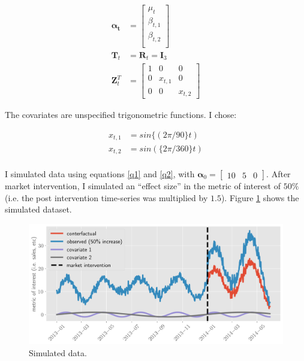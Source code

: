 \documentclass[12pt]{article}
\begin{document}
\begin{align*}
    \boldsymbol{\alpha_t} &= \begin{bmatrix}
\mu_{t} \\
\beta_{t, 1} \\
\beta_{t, 2} \\
\end{bmatrix}\\
\boldsymbol{T}_t &= \boldsymbol{R}_t = \boldsymbol{I}_3\\
\boldsymbol{Z}_t^T &=\begin{bmatrix}
1 & 0 & 0\\
0 & x_{t, 1} & 0\\
0 & 0 & x_{t, 2}
\end{bmatrix} 
\end{align*}

The covariates are unspecified trigonometric functions. I chose:

\begin{align*}
    x_{t, 1} &= sin\{(2\pi/90\}  t) \\
x_{t, 2} &= sin(\{2\pi/360\}  t)\\
\end{align*}

I simulated data using equations \ref{q1} and \ref{q2}, with $\boldsymbol{\alpha}_0 = \begin{bmatrix} 10 &5 & 0
\end{bmatrix} $. After market intervention, I simulated an ``effect size'' in the metric of interest of $50\%$ (i.e. the post intervention time-series was multiplied by $1.5$). Figure \ref{data} shows the simulated dataset. 


\begin{figure}[!h]
    \centering
    \includegraphics[scale=.6
    ]{../figures/data.png}
    \caption{Simulated data.}
    \label{data}
\end{figure}
\end{document}
